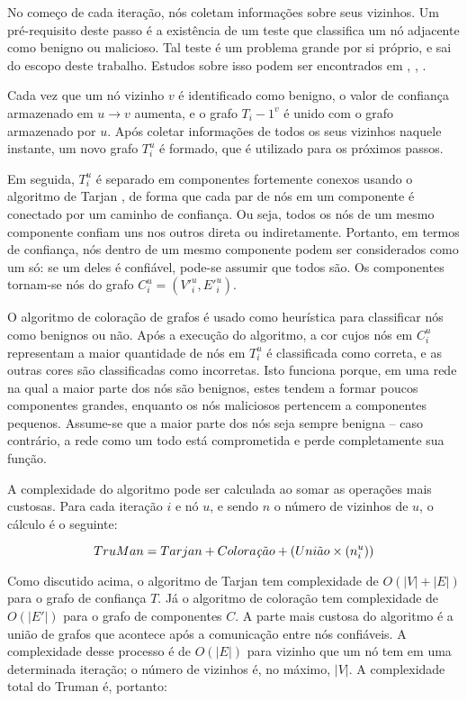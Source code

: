 \begin{resumoextendido}
	No começo de cada iteração, nós coletam informações sobre seus vizinhos.
	Um pré-requisito deste passo é a existência de um teste que classifica um nó adjacente como benigno ou malicioso.
	Tal teste é um problema grande por si próprio, e sai do escopo deste trabalho.
	Estudos sobre isso podem ser encontrados em \citep{golle2004detecting}, \citep{li2016defective}, \citep{kerrache2016detection}.
	
	Cada vez que um nó vizinho $v$ é identificado como benigno, o valor de confiança armazenado em $u \rightarrow v$ aumenta, e o grafo $T_i-1^v$ é unido com o grafo armazenado por $u$.
	Após coletar informações de todos os seus vizinhos naquele instante, um novo grafo $T_i^u$ é formado, que é utilizado para os próximos passos.
	
	Em seguida, $T_i^u$ é separado em componentes fortemente conexos usando o algoritmo de Tarjan \citep{tarjan1972depth}, de forma que cada par de nós em um componente é conectado por um caminho de confiança.
	Ou seja, todos os nós de um mesmo componente confiam uns nos outros direta ou indiretamente.
	Portanto, em termos de confiança, nós dentro de um mesmo componente podem ser considerados como um só: se um deles é confiável, pode-se assumir que todos são.
	Os componentes tornam-se nós do grafo $C^u_i = (V'^u_i, E'^u_i)$.
	
	O algoritmo de coloração de grafos \citep{mittal2011graph} é usado como heurística para classificar nós como benignos ou não.
	Após a execução do algoritmo, a cor cujos nós em $C_i^u$ representam a maior quantidade de nós em $T_i^u$ é classificada como correta, e as outras cores são classificadas como incorretas.
	Isto funciona porque, em uma rede na qual a maior parte dos nós são benignos, estes tendem a formar poucos componentes grandes, enquanto os nós maliciosos pertencem a componentes pequenos.
	Assume-se que a maior parte dos nós seja sempre benigna -- caso contrário, a rede como um todo está comprometida e perde completamente sua função.
	
	A complexidade do algoritmo pode ser calculada ao somar as operações mais custosas.
	Para cada iteração $i$ e nó $u$, e sendo $n$ o número de vizinhos de $u$, o cálculo é o seguinte:
	
	$$ TruMan = Tarjan + Colora\text{\textit{\c{c}}}\tilde ao + (Uni\tilde ao\times(n^u_i)) $$
	
	Como discutido acima, o algoritmo de Tarjan tem complexidade de $O(|V|+|E|)$ para o grafo de confiança $T$.
	Já o algoritmo de coloração tem complexidade de $O(|E'|)$ para o grafo de componentes $C$.
	A parte mais custosa do algoritmo é a união de grafos que acontece após a comunicação entre nós confiáveis.
	A complexidade desse processo é de $O(|E|)$ para vizinho que um nó tem em uma determinada iteração; o número de vizinhos é, no máximo, $|V|$.
	A complexidade total do Truman é, portanto:
	

\end{resumoextendido}
